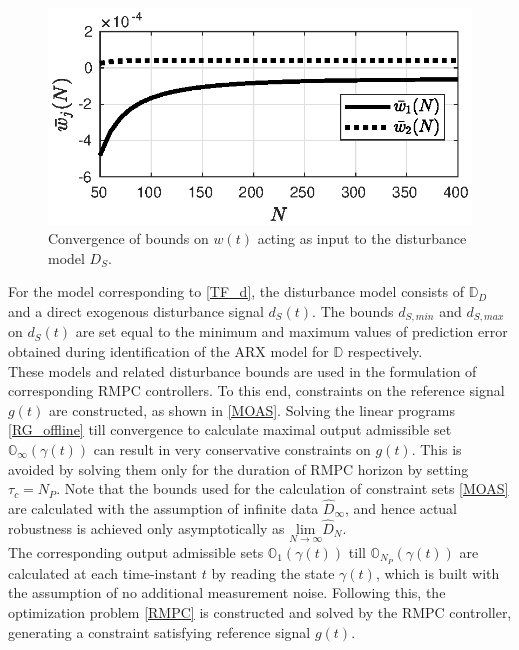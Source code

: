 \documentclass[letterpaper, 10 pt, conference]{ieeeconf}  %
\begin{document}
	\begin{figure}[h]
		\hspace{40pt}
		\includegraphics[scale = 0.50]{bounds_RG.eps}
		\caption{Convergence of bounds on $w(t)$ acting as input to the disturbance model $D_S$.}
		\label{bounds_RG}
	\end{figure} 
	For the model corresponding to \eqref{TF_d}, the disturbance model consists of $\mathbb{D}_D$ and a direct exogenous disturbance signal $d_S(t)$. The bounds $d_{S,min}$ and $d_{S,max}$ on $d_S(t)$ are set equal to the minimum and maximum values of prediction error obtained during identification of the ARX model for $\mathbb{D}$ respectively. \\
	These models and related disturbance bounds are used in the formulation of corresponding RMPC controllers. To this end, constraints on the reference signal $g(t)$ are constructed, as shown in \eqref{MOAS}. Solving the linear programs \eqref{RG_offline} till convergence to calculate maximal output admissible set $\mathbb{O}_{\infty}(\gamma(t))$ can result in very conservative constraints on $g(t)$. This is avoided by solving them only for the duration of RMPC horizon by setting $\tau_c = N_P$. Note that the bounds used for the calculation of constraint sets \eqref{MOAS} are calculated with the assumption of infinite data $\hat{D}_{\infty}$, and hence actual robustness is achieved only asymptotically as $\underset{N \rightarrow \infty}{\text{lim}} \hat{D}_N$.\\
	The corresponding output admissible sets $\mathbb{O}_{1}(\gamma(t))$ till $\mathbb{O}_{N_P}(\gamma(t))$ are calculated at each time-instant $t$ by reading the state $\gamma(t)$, which is built with the assumption of no additional measurement noise.
	Following this,
	the optimization problem \eqref{RMPC} is constructed and solved by the RMPC controller, generating a constraint satisfying reference signal $g(t)$.
\end{document}
